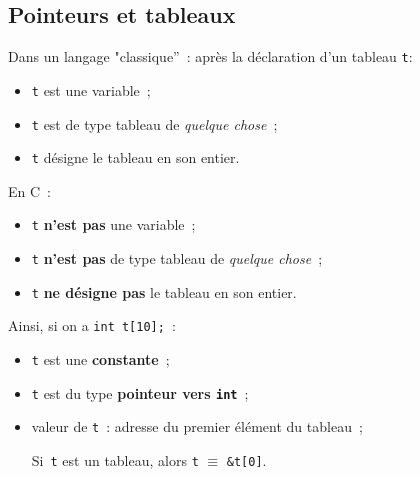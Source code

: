 \begin{frame}
  \section{Pointeurs et tableaux}
  Dans un langage "classique''~: apr\`es la d\'eclaration d'un tableau
  {\tt t}:
  \begin{itemize}
  \item {\tt t} est une variable~;
  \item {\tt t} est de type tableau de {\em quelque chose}~;
  \item {\tt t} d\'esigne le tableau en son entier.
  \end{itemize}
 En C~: 
\begin{itemize}
  \item {\tt t} {\bf n'est pas} une variable~;
  \item {\tt t} {\bf n'est pas} de type tableau de {\em quelque chose}~;
  \item {\tt t} {\bf ne d\'esigne pas} le tableau en son entier.
\end{itemize}
Ainsi, si on a {\tt int t[10];}~:
\begin{itemize}
  \item {\tt t} est une {\bf constante}~;
  \item {\tt t} est du type {\bf pointeur vers {\tt int}}~;
  \item valeur de {\tt t}~: adresse du premier \'el\'ement du tableau~;
    \begin{center}
        Si~{\tt t} est un tableau, alors {\tt t} $\equiv$ {\tt \&t[0]}.
    \end{center}
\end{itemize}
\end{frame}
